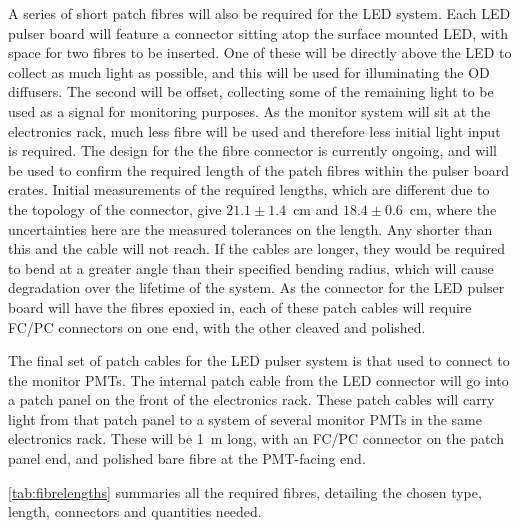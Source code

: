 \documentclass[a4paper,11pt]{article}
\begin{document}
A series of short patch fibres will also be required for the LED system. Each LED pulser board will feature a connector sitting atop the surface mounted LED, with space for two fibres to be inserted. One of these will be directly above the LED to collect as much light as possible, and this will be used for illuminating the OD diffusers. The second will be offset, collecting some of the remaining light to be used as a signal for monitoring purposes. As the monitor system will sit at the electronics rack, much less fibre will be used and therefore less initial light input is required. The design for the the fibre connector is currently ongoing, and will be used to confirm the required length of the patch fibres within the pulser board crates. Initial measurements of the required lengths, which are different due to the topology of the connector, give $21.1\pm1.4$~cm and $18.4\pm0.6$~cm, where the uncertainties here are the measured tolerances on the length. Any shorter than this and the cable will not reach. If the cables are longer, they would be required to bend at a greater angle than their specified bending radius, which will cause degradation over the lifetime of the system. As the connector for the LED pulser board will have the fibres epoxied in, each of these patch cables will require FC/PC connectors on one end, with the other cleaved and polished.

The final set of patch cables for the LED pulser system is that used to connect to the monitor PMTs. The internal patch cable from the LED connector will go into a patch panel on the front of the electronics rack. These patch cables will carry light from that patch panel to a system of several monitor PMTs in the same electronics rack. These will be 1~m long, with an FC/PC connector on the patch panel end, and polished bare fibre at the PMT-facing end.

\cref{tab:fibrelengths} summaries all the required fibres, detailing the chosen type, length, connectors and quantities needed.
\end{document}
